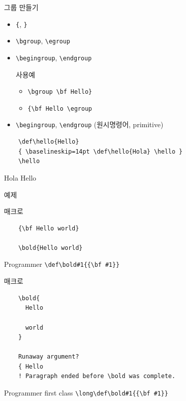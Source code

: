 \documentclass{beamer}
\begin{document}
%
\begin{frame}[fragile]{그룹 만들기}
  \begin{itemize}
  \item \verb+{+, \verb+}+
  \item \verb+\bgroup+, \verb+\egroup+
  \item \verb+\begingroup+, \verb+\endgroup+
    \begin{alertblock}{사용예}
      \begin{itemize}
      \item \verb+\bgroup \bf Hello}+
      \item \verb+{\bf Hello \egroup+
      \end{itemize}
    \end{alertblock}
  \item \verb+\begingroup+, \verb+\endgroup+ (원시명령어, primitive)
  \end{itemize}

  {\small
\begin{verbatim}
    \def\hello{Hello}
    { \baselineskip=14pt \def\hello{Hola} \hello }
    \hello
\end{verbatim}}

  Hola Hello
\end{frame}


%
\begin{frame}[standout]
  예제
\end{frame}


%
\begin{frame}[fragile]{\texttt{\string\bold} 매크로}
\begin{verbatim}
    {\bf Hello world}
    
    \bold{Hello world}
\end{verbatim}
  \begin{alertblock}{Programmer}
    \verb+\def\bold#1{{\bf #1}}+
  \end{alertblock}
\end{frame}


%
\begin{frame}[fragile]{\texttt{\string\bold} 매크로}
\begin{verbatim}
    \bold{
      Hello

      world
    }

    Runaway argument?
    { Hello
    ! Paragraph ended before \bold was complete.
\end{verbatim}
  \begin{alertblock}{Programmer first class}
    \verb+\long\def\bold#1{{\bf #1}}+
  \end{alertblock}
\end{frame}
\end{document}
